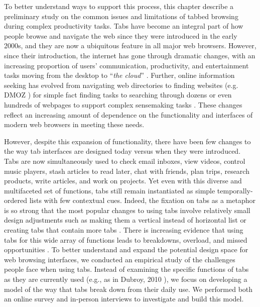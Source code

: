 
To better understand ways to support this process, this chapter describe a preliminary study on the common issues and limitations of tabbed browsing during complex productivity tasks. 
Tabs have become an integral part of how people browse and navigate the web since they were introduced in the early 2000s, and they are now a ubiquitous feature in all major web browsers. However, since their introduction, the internet has gone through dramatic changes, with an increasing proportion of users' communication, productivity, and entertainment tasks moving from the desktop to ``\emph{the cloud}'' \cite{Dubroy:2010:STB:1753326.1753426}. Further, online information seeking has evolved from navigating web directories to finding websites (e.g. DMOZ \cite{dmoz}) for simple fact finding tasks to searching through dozens or even hundreds of webpages to support complex sensemaking tasks \cite{pirolli1999information,marchionini2006exploratory}. These changes reflect an increasing amount of dependence on the functionality and interfaces of modern web browsers in meeting these needs.

However, despite this expansion of functionality, there have been few changes to the way tab interfaces are designed today versus when they were introduced. Tabs are now simultaneously used to check email inboxes, view videos, control music players, stash articles to read later, chat with friends, plan trips, research products, write articles, and work on projects. Yet even with this diverse and multifaceted set of functions, tabs still remain instantiated as simple temporally-ordered lists with few contextual cues. Indeed, the fixation on tabs as a metaphor is so strong that the most popular changes to using tabs involve relatively small design adjustments such as making them a vertical instead of horizontal list \cite{vtabs} or creating tabs that contain more tabs \cite{treetabs}. 
There is increasing evidence that using tabs for this wide array of functions leads to breakdowns, overload, and missed opportunities \cite{web1, web2, web3, web4, web5}.
To better understand and expand the potential design space for web browsing interfaces, we conducted an empirical study of the challenges people face when using tabs. Instead of examining the specific functions of tabs as they are currently used (e.g., as in Dubroy, 2010 \cite{Dubroy:2010:STB:1753326.1753426}), we focus on developing a model of the way that tabs break down from their daily use. We performed both an online survey and in-person interviews to investigate and build this model.

